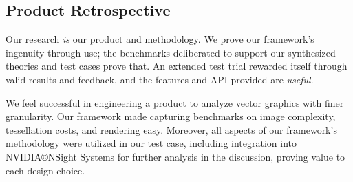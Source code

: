 \subsection{Product Retrospective}
Our research \emph{is} our product and methodology. We prove our framework's ingenuity through use; the benchmarks deliberated to support our synthesized theories and test cases prove that. An extended test trial rewarded itself through valid results and feedback, and the features and API provided are \emph{useful}.\medskip

We feel successful in engineering a product to analyze vector graphics with finer granularity. Our framework made capturing benchmarks on image complexity, tessellation costs, and rendering easy. Moreover, all aspects of our framework's methodology were utilized in our test case, including integration into NVIDIA\copyright NSight Systems for further analysis in the discussion, proving value to each design choice.